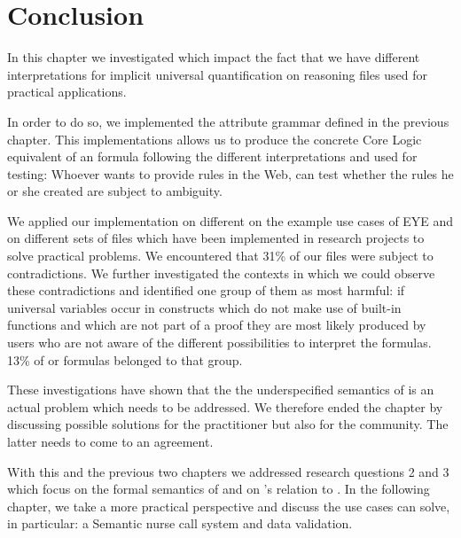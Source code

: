 \section{Conclusion}
In this chapter we investigated which impact the fact that we have different interpretations for implicit universal quantification on 
reasoning files used for practical applications.

In order to do so, we implemented the attribute grammar defined in the previous chapter. 
This implementations allows us to produce the concrete \nthree Core Logic equivalent of an \nthree formula following the different interpretations and 
used for testing: Whoever wants to provide \nthree rules in the Web, can test whether the rules he or she created are subject to ambiguity.  

We applied our implementation on different on the example use cases of EYE and on different sets of files which have been implemented in research projects 
to solve practical problems. We encountered that 31\% of our files were subject to contradictions. 
We further investigated the contexts in which we could observe these contradictions and identified one group of them as most harmful:
if universal variables occur in constructs which do not make use of built-in functions and which are not part of a proof they are most likely produced by users who 
are not aware of the different possibilities to interpret the formulas. 13\% of or formulas belonged to that group.

These investigations have shown that the the underspecified semantics of \nthree is an actual problem which needs to be addressed. We therefore ended the chapter 
by discussing possible solutions for the practitioner but also for the community. The latter needs to come to an agreement. 

With this and the previous two chapters we addressed research questions 2 and 3 which focus on the formal semantics of \nthree and on \nthree's relation to \rdf. In the following 
chapter, we take a more practical perspective and discuss the use cases \nthreelogic can solve, in particular: a Semantic nurse call system and data validation.